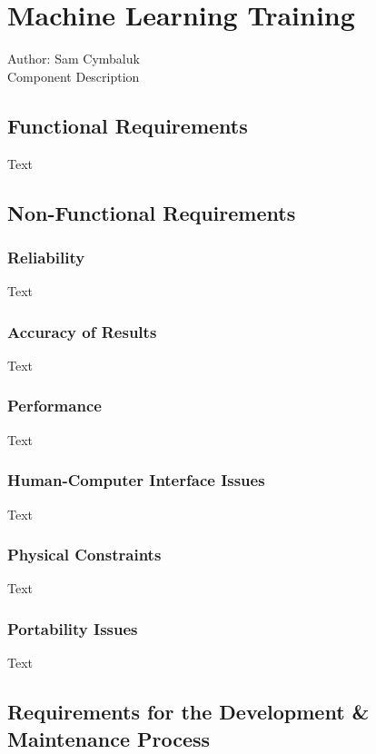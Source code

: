 \documentclass[12pt]{article}
\begin{document}
\section{Machine Learning Training}
Author: Sam Cymbaluk\\

\noindent Component Description

\subsection{Functional Requirements}

Text

\subsection{Non-Functional Requirements}

\subsubsection {Reliability}

Text

\subsubsection {Accuracy of Results}

Text

\subsubsection {Performance}

Text

\subsubsection {Human-Computer Interface Issues}

Text

\subsubsection {Physical Constraints}

Text

\subsubsection {Portability Issues}

Text

\subsection{Requirements for the Development \& Maintenance Process}
\end{document}
